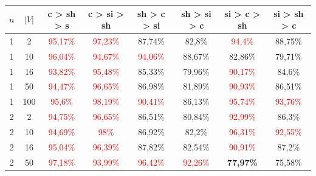 \begin{table}[ht]
    \centering
    \begin{tabular}{cc|c|c|c|c|c|c}
        \toprule
        $n$ & $|V|$ & \textbf{c > sh > s}               & \textbf{c > si > sh}              & \textbf{sh > c > si}     & \textbf{sh > si > c}      & \textbf{si > c > sh}      & \textbf{si > sh > c}      \\\midrule
        {1} & {2}   & \textcolor{red}{95,17\%}          & \textcolor{red}{97,23\%}          & {87,74\%}                & {82,8\%}                  & \textcolor{red}{94,4\%}   & {88,75\%}                 \\
        {1} & {10}  & \textcolor{red}{96,04\%}          & \textcolor{red}{94,67\%}          & \textcolor{red}{94,06\%} & {88,67\%}                 & {82,86\%}                 & {79,71\%}                 \\
        {1} & {16}  & \textcolor{red}{93,82\%}          & \textcolor{red}{95,48\%}          & {85,33\%}                & {79,96\%}                 & \textcolor{red}{90,17\%}  & {84,6\%}                  \\
        {1} & {50}  & \textcolor{red}{94,47\%}          & \textcolor{red}{96,65\%}          & {86,98\%}                & {81,89\%}                 & \textcolor{red}{90,93\%}  & {86,51\%}                 \\
        {1} & {100} & \textcolor{red}{95,6\%}           & \textcolor{red}{98,19\%}          & \textcolor{red}{90,41\%} & {86,13\%}                 & \textcolor{red}{95,74\%}  & \textcolor{red}{93,76\%}  \\
        {2} & {2}   & \textcolor{red}{94,75\%}          & \textcolor{red}{96,65\%}          & {86,51\%}                & {80,84\%}                 & \textcolor{red}{92,99\%}  & {86,3\%}                  \\
        {2} & {10}  & \textcolor{red}{94,69\%}          & \textcolor{red}{98\%}             & {86,92\%}                & {82,2\%}                  & \textcolor{red}{96,31\%}  & \textcolor{red}{92,55\%}  \\
        {2} & {16}  & \textcolor{red}{95,04\%}          & \textcolor{red}{96,39\%}          & {87,82\%}                & {82,54\%}                 & \textcolor{red}{90,91\%}  & {87,2\%}                  \\
        {2} & {50}  & \textcolor{red}{97,18\%}          & \textcolor{red}{93,99\%}          & \textcolor{red}{96,42\%} & \textcolor{red}{92,26\%}  & \textbf{77,97\%}          & {75,58\%}                 \\

\end{tabular}
\end{table}
